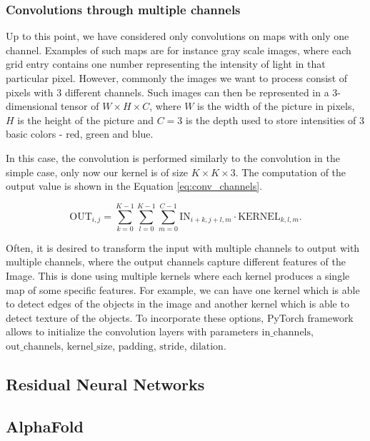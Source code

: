 \subsubsection{Convolutions through multiple channels}
Up to this point, we have considered only convolutions on maps with only one channel.
Examples of such maps are for instance gray scale images, where each grid entry contains one number representing the intensity of light in that particular pixel.
However, commonly the images we want to process consist of pixels with 3 different channels.
Such images can then be represented in a 3-dimensional tensor of $W \times H \times C$, where $W$ is the width of the picture in pixels, $H$ is the height of the picture and $C=3$ is the depth used to store intensities of 3 basic colors - red, green and blue. 

In this case, the convolution is performed similarly to the convolution in the simple case, only now our kernel is of size $K \times K \times 3$.
The computation of the output value is shown in the Equation \ref{eq:conv_channels}.

\begin{equation}
    \text{OUT}_{i,j} = \sum_{k=0}^{K-1} \sum_{l=0}^{K-1} \sum_{m=0}^{C-1} 
        \text{IN}_{i+k,j+l, m} \cdot \text{KERNEL}_{k, l, m}.
    \label{eq:conv_channels}
\end{equation}

Often, it is desired to transform the input with multiple channels to output with multiple channels, where the output channels capture different features of the Image.
This is done using multiple kernels where each kernel produces a single map of some specific features.
For example, we can have one kernel which is able to detect edges of the objects in the image and another kernel which is able to detect texture of the objects.
To incorporate these options, PyTorch framework allows to initialize the convolution layers with parameters $\text{in\_channels}$, $\text{out\_channels}$, $\text{kernel\_size}$, $\text{padding}$, $\text{stride}$, $\text{dilation}$.












\subsection{Residual Neural Networks}
    
\subsection{AlphaFold}

\newpage